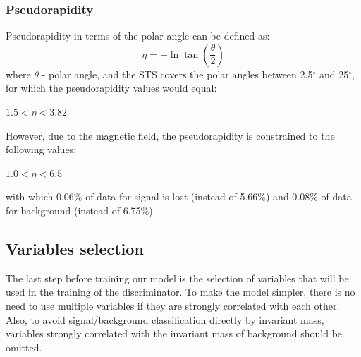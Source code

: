 \subsubsection{Pseudorapidity}
Pseudorapidity in terms of the polar angle can be defined as:
\begin{equation}
    \eta = -\ln{\tan(\frac{\theta}{2})}
\end{equation}
where $\theta$ - polar angle, and the STS covers the polar angles between 2.5$^{\circ}$ and 25$^{\circ}$, for which the pseudorapidity values would equal:
\begin{center}
    $ 1.5< \eta < 3.82 $
\end{center}
However, due to the magnetic field, the pseudorapidity is constrained to the following values:
\begin{center}
    $ 1.0< \eta < 6.5 $
\end{center}
with which 0.06\% of data for signal is lost (instead of 5.66\%) and 0.08\% of data for background (instead of 6.75\%)

\subsection{Variables selection}
The last step before training our model is the selection of variables that will be used in the training of the discriminator. To make the model simpler, there is no need to use multiple variables if they are strongly correlated with each other. Also, to avoid signal/background classification directly by invariant mass, variables strongly correlated with the invariant mass of background should be omitted.
